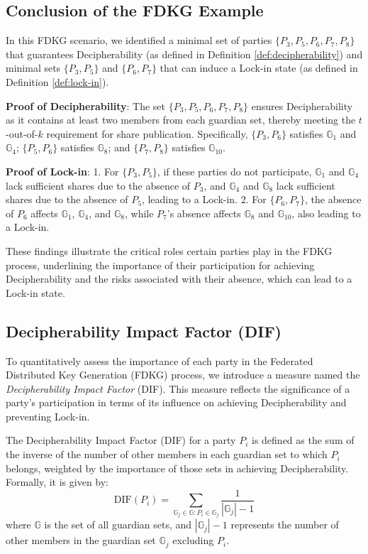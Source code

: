 \documentclass{article}
\begin{document}
\subsection*{Conclusion of the FDKG Example}

In this FDKG scenario, we identified a minimal set of parties \(\{P_3, P_5, P_6, P_7, P_8\}\) that guarantees Decipherability (as defined in Definition \ref{def:decipherability}) and minimal sets \(\{P_3, P_5\}\) and \(\{P_6, P_7\}\) that can induce a Lock-in state (as defined in Definition \ref{def:lock-in}).

\textbf{Proof of Decipherability}: 
The set \(\{P_3, P_5, P_6, P_7, P_8\}\) ensures Decipherability as it contains at least two members from each guardian set, thereby meeting the \(t\)-out-of-\(k\) requirement for share publication. Specifically, \(\{P_3, P_6\}\) satisfies \(\mathbb{G}_1\) and \(\mathbb{G}_4\); \(\{P_5, P_6\}\) satisfies \(\mathbb{G}_8\); and \(\{P_7, P_8\}\) satisfies \(\mathbb{G}_{10}\).

\textbf{Proof of Lock-in}:
1. For \(\{P_3, P_5\}\), if these parties do not participate, \(\mathbb{G}_1\) and \(\mathbb{G}_4\) lack sufficient shares due to the absence of \(P_3\), and \(\mathbb{G}_4\) and \(\mathbb{G}_8\) lack sufficient shares due to the absence of \(P_5\), leading to a Lock-in.
2. For \(\{P_6, P_7\}\), the absence of \(P_6\) affects \(\mathbb{G}_1\), \(\mathbb{G}_4\), and \(\mathbb{G}_8\), while \(P_7\)'s absence affects \(\mathbb{G}_8\) and \(\mathbb{G}_{10}\), also leading to a Lock-in.

These findings illustrate the critical roles certain parties play in the FDKG process, underlining the importance of their participation for achieving Decipherability and the risks associated with their absence, which can lead to a Lock-in state.

\subsection*{Decipherability Impact Factor (DIF)}

To quantitatively assess the importance of each party in the Federated Distributed Key Generation (FDKG) process, we introduce a measure named the \textit{Decipherability Impact Factor} (DIF). This measure reflects the significance of a party's participation in terms of its influence on achieving Decipherability and preventing Lock-in.

\begin{definition}
    The Decipherability Impact Factor (DIF) for a party $P_i$ is defined as the sum of the inverse of the number of other members in each guardian set to which $P_i$ belongs, weighted by the importance of those sets in achieving Decipherability. Formally, it is given by:
    \[
    \text{DIF}(P_i) = \sum_{\mathbb{G}_j \in \mathbb{G} : P_i \in \mathbb{G}_j} \frac{1}{|\mathbb{G}_j| - 1}
    \]
    where $\mathbb{G}$ is the set of all guardian sets, and $|\mathbb{G}_j| - 1$ represents the number of other members in the guardian set $\mathbb{G}_j$ excluding $P_i$.
\end{definition}
\end{document}
